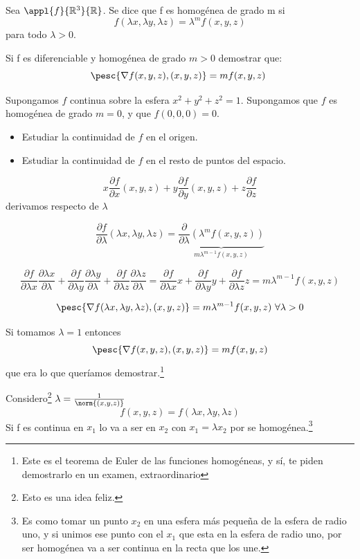 \begin{problem}[1]
 Sea $\appl{f}{\mathbb{R}^3}{\mathbb{R}}$. Se dice que f es homogénea de grado m si
\[ f(\lambda x, \lambda y, \lambda z) = \lambda ^m f(x,y,z) \] para todo $\lambda > 0$.

\ppart  Si f es diferenciable y homogénea de grado $m>0$ demostrar que:
\[ \pesc{\nabla f(x,y,z), (x,y,z)} = mf(x,y,z) \]

\ppart Supongamos $f$ continua sobre la esfera ${x^2+y^2+z^2=1}$. Supongamos que $f$ es homogénea de grado $m = 0$, y que $f(0,0,0) = 0$.

\begin{itemize}
\item Estudiar la continuidad de $f$ en el origen.
\item Estudiar la continuidad de $f$ en el resto de puntos del espacio.
\end{itemize}

\solution

\spart \[ x\frac{\partial  f}{\partial  x}(x,y,z) + y\frac{\partial  f}{\partial  y}(x,y,z) + z\frac{\partial  f}{\partial  z}\]
derivamos respecto de $\lambda$

$$\frac{\partial  f}{\partial  \lambda}(\lambda x, \lambda y, \lambda z) = \underbrace{\frac{\partial }{\partial  \lambda}(\lambda^mf(x,y,z))}_{m\lambda^{m-1}f(x,y,z)}$$

$$\frac{\partial  f}{\partial  \lambda x}\frac{\partial  \lambda x}{\partial  \lambda} + \frac{\partial  f}{\partial  \lambda y}\frac{\partial  \lambda y}{\partial  \lambda} + \frac{\partial  f}{\partial  \lambda z}\frac{\partial  \lambda z}{\partial  \lambda} = \frac{\partial  f}{\partial  \lambda x}x + \frac{\partial  f}{\partial  \lambda y}y + \frac{\partial  f}{\partial  \lambda z}z = m\lambda ^{m-1} f(x,y,z) $$

$$\pesc{\nabla f(\lambda x,\lambda y,\lambda z), (x,y,z)} = m\lambda^{m-1} f(x,y,z)\ \forall \lambda > 0$$

Si tomamos $\lambda = 1$ entonces $$\pesc{\nabla f(x,y,z), (x,y,z)} = mf(x,y,z)$$ que era lo que queríamos demostrar.\footnote{Este es el teorema de Euler de las funciones homogéneas, y sí, te piden demostrarlo en un examen, extraordinario}


\spart
Considero\footnote{Esto es una idea feliz.} $\lambda = \frac{1}{\norm{(x,y,z)}}$\\
\[ f(x,y,z) = f(\lambda x, \lambda y, \lambda z) \]
Si f es continua en $x_1$ lo va a ser en $x_2$ con $x_1 = \lambda x_2$ por se homogénea.\footnote{Es como tomar un punto $x_2$ en una esfera más pequeña de la esfera de radio uno, y si unimos ese punto con el $x_1$ que esta en la esfera de radio uno, por ser homogénea va a ser continua en la recta que los une.}


\end{problem}
